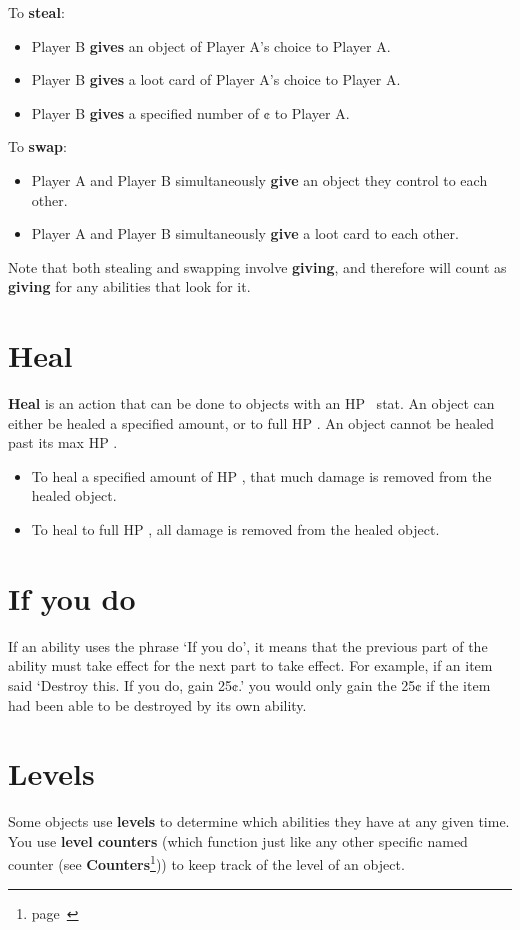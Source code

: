\documentclass[
  fontsize=10pt,
  paper=a5,
  version=last,
  chapterprefix=true,
  bindingoffset=5mm,
  ]{scrbook}
\newcommand*{\inlineicon}[1]{%
    \raisebox{-.3\baselineskip}{%
        \smash{%
            \texttt{[image: \#1]}%
        }%
    }%
}
\newcommand{\heart}{\inlineicon{./assets/ms-heart.png}}
\begin{document}
    To \textbf{steal}:
    \begin{itemize}
        \item Player B \textbf{gives} an object of Player A’s choice to Player A.
        \item Player B \textbf{gives} a loot card of Player A’s choice to Player A.
        \item Player B \textbf{gives} a specified number of ¢ to Player A.
    \end{itemize}

    To \textbf{swap}:
    \begin{itemize}
        \item Player A and Player B simultaneously \textbf{give} an object they control to each other.
        \item Player A and Player B simultaneously \textbf{give} a loot card to each other.
    \end{itemize}
    
    Note that both stealing and swapping involve \textbf{giving}, and therefore will count as \textbf{giving} for any abilities that look for it.
    \section{Heal}
    \textbf{Heal} is an action that can be done to objects with an HP\heart\ stat. An object can either be healed a specified amount, or to full HP\heart. An object cannot be healed past its max HP\heart.

    \begin{itemize}
        \item To heal a specified amount of HP\heart, that much damage is removed from the healed object. 
        \item To heal to full HP\heart, all damage is removed from the healed object.
    \end{itemize}
    \section{If you do}
    If an ability uses the phrase ‘If you do’, it means that the previous part of the ability must take effect for the next part to take effect. For example, if an item said ‘Destroy this. If you do, gain 25¢.’ you would only gain the 25¢ if the item had been able to be destroyed by its own ability.
    \section{Levels}
    Some objects use \textbf{levels} to determine which abilities they have at any given time. You use \textbf{level counters} (which function just like any other specific named counter (see \textbf{Counters}\footnote{page~\pageref{counters}})) to keep track of the level of an object.
\end{document}
